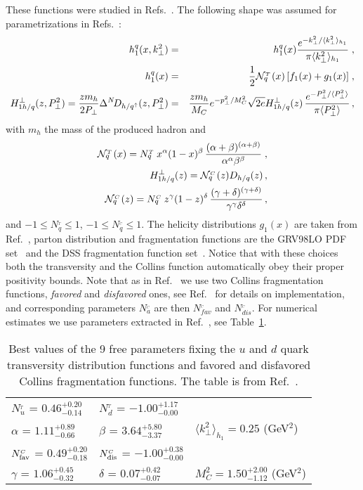 \documentclass[a4paper,11pt]{article}
\newcommand{\ba}{\begin{eqnarray}}
\newcommand{\ea}{\end{eqnarray}}
\newcommand{\la}{\langle}
\newcommand{\ra}{\rangle}
\def\T{_{_T}}
\def\C{_{_C}}
\def\kperp{k_\perp}
\def\pperp{P_\perp}
\def\avkperp{\la \kperp^2 \ra}
\def\avpperp{\la \pperp^2 \ra}
\begin{document}
These functions were studied in
Refs.~\cite{Anselmino:2007fs,Anselmino:2008jk,Anselmino:2013vqa,
Kang:2014zza,Kang:2015msa,Anselmino:2015sxa}.
The following shape was assumed for parametrizations in
Refs.~\cite{Anselmino:2007fs,Anselmino:2008jk,Anselmino:2013vqa}:
 \ba
h_{1}^{q} (x, \kperp^2) &=&h_{1}^{q} (x)  \frac{e^{-{\kperp^2}/{\avkperp_{h_1} }}}{\pi \avkperp_{h_1}} \; ,\label{tr-funct}\\
h_{1}^{q} (x) &=&\frac{1}{2} {\cal N}^{\T}_q(x)\,
[f_{1}(x)+g_1(x)]\; ,\\
H_{1 h/q}^{\perp}(z, \pperp^2) = \frac{z m_h}{2 \pperp} \Delta^N \! D_{h/q^\uparrow}(z,\pperp^2) &=&  \frac{z m_h}{M_C} e^{-p_{\perp}^2/M_C^2} \sqrt{2 e} H_{1 h/q}^{\perp}(z) \,\frac{e^{-\pperp^2/{\avpperp}}}{\pi \avpperp}\,,
\label{coll-funct}
 \ea
 with $m_h$ the mass of the produced hadron and
 \ba
 {\cal N}^{\T}_q(x)= N^{\T}_q
\,x^{\alpha} (1-x)^{\beta} \, \frac{(\alpha + \beta)^{(\alpha
+\beta)}} {\alpha^{\alpha} \beta^{\beta}}\; ,
\\
H_{1 h/q}^{\perp}(z) =  {\cal N}^{\C}_q(z) D_{h/q}(z)\, , \\
{\cal N}^{\C}_q(z)= N^{\C}_q \, z^{\gamma} (1-z)^{\delta} \,
\frac{(\gamma + \delta)^{(\gamma +\delta)}}
{\gamma^{\gamma} \delta^{\delta}}\, ,
 \ea
and $-1\le N^{\T}_q\le 1$, $-1 \le N^{\C}_q \le 1$. The helicity distributions $g_1(x)$ are taken
from Ref.~\cite{Gluck:2000dy}, parton distribution and fragmentation functions are the GRV98LO PDF set~\cite{Gluck:1998xa} and the
DSS fragmentation function set~\cite{deFlorian:2007aj}. Notice that with these choices both
the transversity and the Collins function automatically obey their
proper positivity bounds. Note that as in Ref.~\cite{Anselmino:2013vqa} we use two
Collins fragmentation functions, {\it favored} and {\it disfavored} ones, see Ref.~\cite{Anselmino:2013vqa} for details on implementation, and corresponding parameters ${N}^{\C}_a$ are then  ${N}^{\C}_{fav}$ and ${N}^{\C}_{dis}$. For numerical estimates we use parameters extracted in Ref.~\cite{Anselmino:2013vqa}, see Table~\ref{fitpar}.

\begin{table}[h]
\centering
\renewcommand{\tabcolsep}{0.4pc} %
\renewcommand{\arraystretch}{1.2} %
\begin{tabular}{@{ }lll}
 \hline
 $N_{u}^{\T}$ = $0.46^{+0.20}_{-0.14}$ & $N_{d}^{\T}$ = $ -1.00^{+1.17}_{-0.00}$ \\
 $\alpha$ =  $1.11^{+0.89}_{-0.66}$ & $\beta$  = $3.64^{+5.80}_{-3.37}$ &
 $\avkperp_{h_1} = 0.25$ (GeV$^2$) \\
 \hline
 $N_{\rm fav}^{\C}$  = $0.49^{+0.20}_{-0.18}$ & $N_{\rm dis}^{\C}$  =
 $-1.00^{+0.38}_{-0.00}$ \\
 $\gamma$  = $1.06^{+0.45}_{-0.32}$  & $\delta$   = $0.07^{+0.42}_{-0.07}$  &
 $M^2_C = 1.50^{+2.00}_{-1.12}$ (GeV$^2$) \\
 \hline
\end{tabular}
	\caption{Best values of the 9 free parameters fixing
	the $u$ and $d$ quark transversity distribution functions and
	favored and disfavored Collins fragmentation functions.
	The table is from Ref.~\cite{Anselmino:2013vqa}.
\label{fitpar}}
\end{table}
\end{document}
